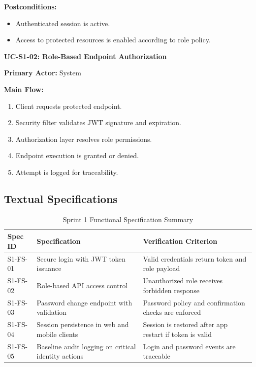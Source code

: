\textbf{Postconditions:}
\begin{itemize}
\item Authenticated session is active.
\item Access to protected resources is enabled according to role policy.
\end{itemize}

\textbf{UC-S1-02: Role-Based Endpoint Authorization}

\textbf{Primary Actor:} System

\textbf{Main Flow:}
\begin{enumerate}
\item Client requests protected endpoint.
\item Security filter validates JWT signature and expiration.
\item Authorization layer resolves role permissions.
\item Endpoint execution is granted or denied.
\item Attempt is logged for traceability.
\end{enumerate}

\subsection{Textual Specifications}

\begin{table}[H]
\centering
\caption{Sprint 1 Functional Specification Summary}
\label{tab:sprint1_functional_specs}
\begin{tabularx}{\textwidth}{|l|X|X|}
\hline
\textbf{Spec ID} & \textbf{Specification} & \textbf{Verification Criterion} \\
\hline
S1-FS-01 & Secure login with JWT token issuance & Valid credentials return token and role payload \\
\hline
S1-FS-02 & Role-based API access control & Unauthorized role receives forbidden response \\
\hline
S1-FS-03 & Password change endpoint with validation & Password policy and confirmation checks are enforced \\
\hline
S1-FS-04 & Session persistence in web and mobile clients & Session is restored after app restart if token is valid \\
\hline
S1-FS-05 & Baseline audit logging on critical identity actions & Login and password events are traceable \\
\hline
\end{tabularx}
\end{table}

